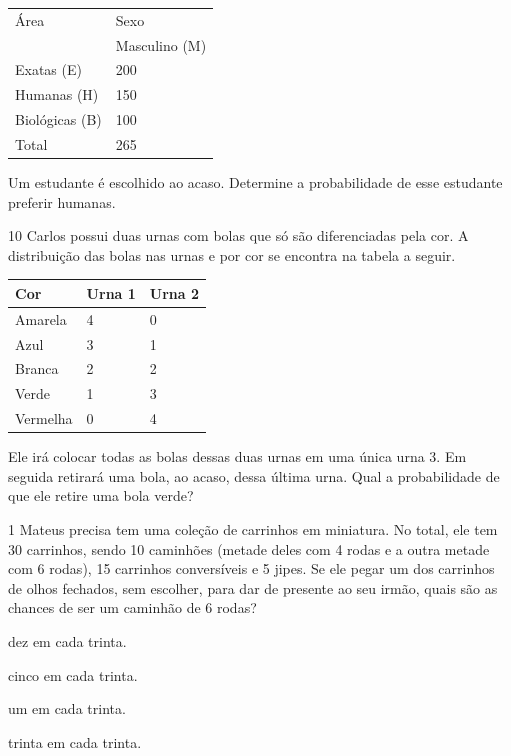 \begin{multicols}{2}
\begin{longtable}[]{@{}ll@{}}
\toprule
Área & Sexo\tabularnewline
& Masculino (M)\tabularnewline
Exatas (E) & 200\tabularnewline
Humanas (H) & 150\tabularnewline
Biológicas (B) & 100\tabularnewline
Total & 265\tabularnewline
\bottomrule
\end{longtable}

Um estudante é escolhido ao acaso. Determine a probabilidade de esse
estudante preferir humanas.





\num{10} Carlos possui duas urnas com bolas que só são diferenciadas pela cor. A
distribuição das bolas nas urnas e por cor se encontra na tabela a
seguir.

\begin{longtable}[]{@{}lll@{}}
\toprule
Cor & Urna 1 & Urna 2\tabularnewline
\midrule
\endhead
Amarela & 4 & 0\tabularnewline
Azul & 3 & 1\tabularnewline
Branca & 2 & 2\tabularnewline
Verde & 1 & 3\tabularnewline
Vermelha & 0 & 4\tabularnewline
\bottomrule
\end{longtable}

Ele irá colocar todas as bolas dessas duas urnas em uma única urna 3. Em
seguida retirará uma bola, ao acaso, dessa última urna. Qual a
probabilidade de que ele retire uma bola verde?






\num{1} Mateus precisa tem uma coleção de carrinhos em miniatura. No total, ele tem 30 carrinhos, sendo 10 caminhões (metade deles com 4 rodas e a outra metade com 6 rodas), 15 carrinhos conversíveis e 5 jipes. Se ele pegar um dos carrinhos de olhos fechados, sem escolher, para dar de presente ao seu irmão, quais são as chances de ser um caminhão de 6 rodas?

\begin{minipage}{.5\textwidth}
\begin{escolha}
\item
  dez em cada trinta.
\item
  cinco em cada trinta.
\item
  um em cada trinta.
\item
  trinta em cada trinta.
\end{escolha}
\end{minipage}




\end{multicols}
